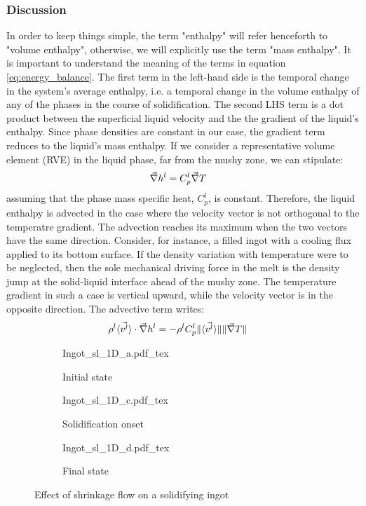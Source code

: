 \subsubsection{Discussion}
In order to keep things simple, the term "enthalpy" will refer henceforth to "volume enthalpy",
otherwise, we will explicitly use the term "mass enthalpy". It is important to understand the 
meaning of the terms in equation \eqref{eq:energy_balance}.
The first term in the left-hand side is the temporal change in the system's average enthalpy,
i.e. a temporal change in the volume enthalpy of any of the phases in the course of solidification.
The second LHS term is a dot product between the superficial liquid velocity and the the gradient
of the liquid's enthalpy. Since phase densities are constant in our case, the gradient term reduces
to the liquid's mass enthalpy. If we consider a representative volume element (RVE) in the liquid
phase, far from the mushy zone, we can stipulate:
\begin{align}
\label{eq:gradient_liquid_enthalpy}
& \vec{\nabla} h^l = C_p^l \vec{\nabla} T
\end{align}
assuming that the phase mass specific heat, $ C_p^l $, is constant. Therefore, the liquid enthalpy
is advected in the case where the velocity vector is not orthogonal to the temperatre gradient.
The advection reaches its maximum when the two vectors have the same direction. Consider, for instance,
a filled ingot with a cooling flux applied to its bottom surface. If the density variation with temperature
were to be neglected, then the sole mechanical driving force in the melt is the density jump at the solid-liquid
interface ahead of the mushy zone. The temperature gradient in such a case is vertical upward, while the velocity
vector is in the opposite direction. The advective term writes:
\begin{align}
& \rho^l \langle \vec{v^l} \rangle \cdot \vec{\nabla} h^l = - \rho^l C_p^l \lVert \langle \vec{v^l} \rangle \rVert \lVert \vec{\nabla} T \rVert
\end{align}
\begin{figure}
\centering
\begin{subfigure}[h!]{0.3\textwidth}\centering %
	\def\svgwidth{100pt}
	{Ingot_sl_1D_a.pdf_tex}
	\caption{Initial state}
	\label{fig:ingot_1d_a}
\end{subfigure}
\begin{subfigure}[h!]{0.3\textwidth}\centering %
	\centering
	\def\svgwidth{100pt}
	{Ingot_sl_1D_c.pdf_tex}
	\caption{Solidification onset}
	\label{fig:ingot_1d_c}
\end{subfigure}
\begin{subfigure}[h!]{0.3\textwidth}\centering %
	\centering
	\def\svgwidth{100pt}
	{Ingot_sl_1D_d.pdf_tex}
	\caption{Final state}
	\label{fig:ingot_1d_d}
\end{subfigure}
\caption{Effect of shrinkage flow on a solidifying ingot}
\end{figure}
